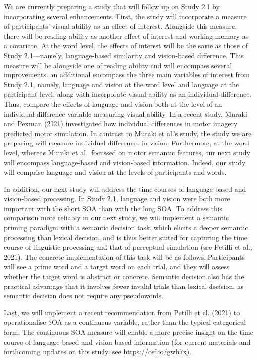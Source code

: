 \documentclass[
  12pt,
  man,floatsintext]{apa7}
\begin{document}
We are currently preparing a study that will follow up on Study 2.1 by incorporating several enhancements. First, the study will incorporate a measure of participants' visual ability as an effect of interest. Alongside this measure, there will be reading ability as another effect of interest and working memory as a covariate. At the word level, the effects of interest will be the same as those of Study 2.1---namely, language-based similarity and vision-based difference. This measure will be alongside one of reading ability and will encompass several improvements. an additional encompass the three main variables of interest from Study 2.1, namely, language and vision at the word level and language at the participant level. along with incorporate visual ability as an individual difference. Thus, compare the effects of language and vision both at the level of an individual difference variable measuring visual ability. In a recent study, Muraki and Pexman (2021) investigated how individual differences in motor imagery predicted motor simulation. In contrast to Muraki et al.'s study, the study we are preparing will measure individual differences in vision. Furthermore, at the word level, whereas Muraki et al.~focussed on motor semantic features, our next study will encompass language-based and vision-based information. Indeed, our study will comprise language and vision at the levels of participants and words.

In addition, our next study will address the time courses of language-based and vision-based processing. In Study 2.1, language and vision were both more important with the short SOA than with the long SOA. To address this comparison more reliably in our next study, we will implement a semantic priming paradigm with a semantic decision task, which elicits a deeper semantic processing than lexical decision, and is thus better suited for capturing the time course of linguistic processing and that of perceptual simulation (see Petilli et al., 2021). The concrete implementation of this task will be as follows. Participants will see a prime word and a target word on each trial, and they will assess whether the target word is abstract or concrete. Semantic decision also has the practical advantage that it involves fewer invalid trials than lexical decision, as semantic decision does not require any pseudowords.

Last, we will implement a recent recommendation from Petilli et al. (2021) to operationalise SOA as a continuous variable, rather than the typical categorical form. The continuous SOA measure will enable a more precise insight on the time course of language-based and vision-based information (for current materials and forthcoming updates on this study, see \url{https://osf.io/gwh7x}).
\end{document}
